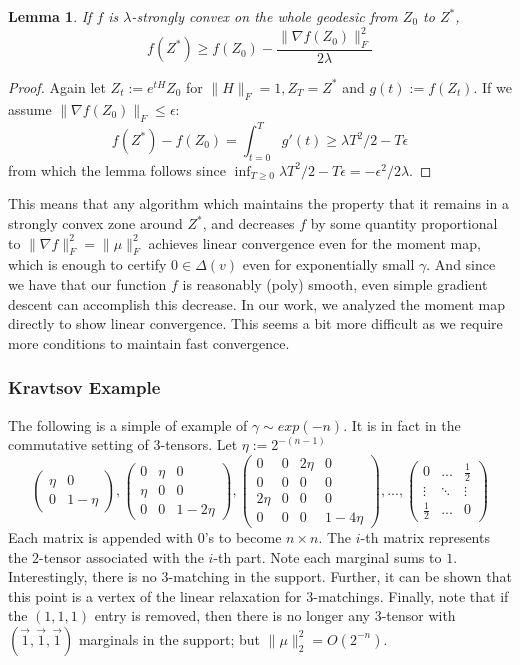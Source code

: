\documentclass{article}
\newtheorem{lemma}[theorem]{Lemma}
\begin{document}
\begin{lemma}
If $f$ is $\lambda$-strongly convex on the whole geodesic from $Z_{0}$ to $Z^{*}$, 
\[ f(Z^{*}) \geq f(Z_{0}) -  \frac{\|\nabla f(Z_{0})\|_{F}^{2}}{2 \lambda}  \]
\end{lemma}
\begin{proof}
Again let $Z_{t} := e^{tH} Z_{0}$ for $\|H\|_{F} = 1, Z_{T} = Z^{*}$ and $g(t) := f(Z_{t})$. If we assume $\|\nabla f(Z_{0})\|_{F} \leq \epsilon$:
\[ f(Z^{*}) - f(Z_{0}) = \int_{t=0}^{T} g'(t) \geq \lambda T^{2}/2 - T \epsilon \]
from which the lemma follows since $\inf_{T \geq 0} \lambda T^{2}/2 - T \epsilon = - \epsilon^{2}/2 \lambda$. 
\end{proof}
This means that any algorithm which maintains the property that it remains in a strongly convex zone around $Z^{*}$, and decreases $f$ by some quantity proportional to $\|\nabla f\|_{F}^{2} = \|\mu\|_{F}^{2}$ achieves linear convergence even for the moment map, which is enough to certify $0 \in \Delta(v)$ even for exponentially small $\gamma$. And since we have that our function $f$ is reasonably (poly) smooth, even simple gradient descent can accomplish this decrease. In our work, we analyzed the moment map directly to show linear convergence. This seems a bit more difficult as we require more conditions to maintain fast convergence. 

\subsubsection{Kravtsov Example}
The following is a simple of example of $\gamma \sim exp(-n)$. It is in fact in the commutative setting of $3$-tensors. Let $\eta := 2^{-(n-1)}$
\[ \begin{pmatrix}
     \eta  & 0
\\   0     & 1-\eta
   \end{pmatrix},
   \begin{pmatrix}
     0     & \eta & 0
\\   \eta  & 0    & 0
\\   0     & 0    & 1-2\eta
   \end{pmatrix},
   \begin{pmatrix}
     0     & 0    & 2\eta & 0
\\   0     & 0    & 0     & 0
\\   2\eta & 0    & 0     & 0
\\   0     & 0    & 0     & 1-4\eta
   \end{pmatrix},
   ...,
   \begin{pmatrix}
     0 & ... & \frac{1}{2}
\\   \vdots & \ddots & \vdots
\\   \frac{1}{2} & ... & 0
   \end{pmatrix}
\]
Each matrix is appended with 0's to become $n \times n$. The $i$-th matrix represents the $2$-tensor associated with the $i$-th part. Note each marginal sums to $1$. Interestingly, there is no $3$-matching in the support. Further, it can be shown that this point is a vertex of the linear relaxation for $3$-matchings. Finally, note that if the $(1,1,1)$ entry is removed, then there is no longer any $3$-tensor with $(\vec{1},\vec{1},\vec{1})$ marginals in the support; but $ \|\mu\|_{2}^{2} = O(2^{-n})$. 
\end{document}
